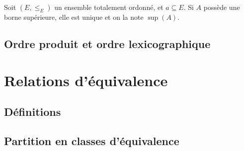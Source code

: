 \begin{proposition}Soit $(E,\leq_E)$ un ensemble totalement ordonné, et $a\subseteq E$. Si $A$ possède une borne supérieure, elle est unique et on la note $\sup(A)$.
\end{proposition}

\subsection{Ordre produit et ordre lexicographique}

\section{Relations d'équivalence}

\subsection{Définitions}

\subsection{Partition en classes d'équivalence}